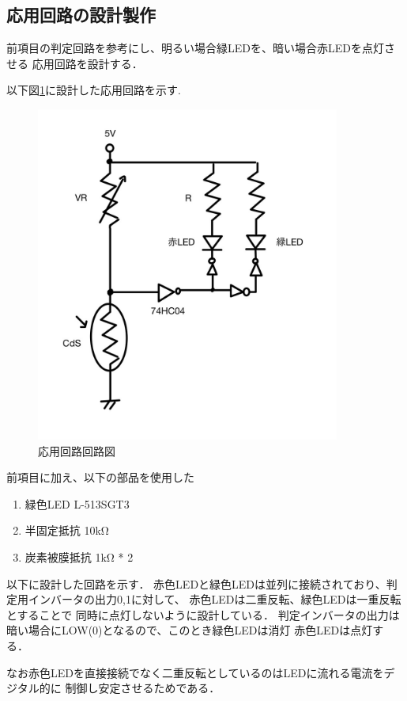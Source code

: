 \documentclass[titlepage]{jarticle}
\begin{document}
\subsection{応用回路の設計製作}
前項目の判定回路を参考にし、明るい場合緑LEDを、暗い場合赤LEDを点灯させる
応用回路を設計する．

以下図\ref{fig:応用回路回路図}に設計した応用回路を示す.
\begin{figure}[H]
    \begin{center}
        \includegraphics[width=10cm]{image/3.jpg}
        \caption{応用回路回路図}
        \label{fig:応用回路回路図}
    \end{center}
\end{figure}

前項目に加え、以下の部品を使用した
\begin{enumerate}
    \item 緑色LED L-513SGT3
    \item 半固定抵抗 10kΩ
    \item 炭素被膜抵抗 1kΩ * 2
\end{enumerate}

以下に設計した回路を示す．
赤色LEDと緑色LEDは並列に接続されており、判定用インバータの出力0,1に対して、
赤色LEDは二重反転、緑色LEDは一重反転とすることで
同時に点灯しないように設計している．
判定インバータの出力は暗い場合にLOW(0)となるので、このとき緑色LEDは消灯
赤色LEDは点灯する．

なお赤色LEDを直接接続でなく二重反転としているのはLEDに流れる電流をデジタル的に
制御し安定させるためである．
\end{document}
